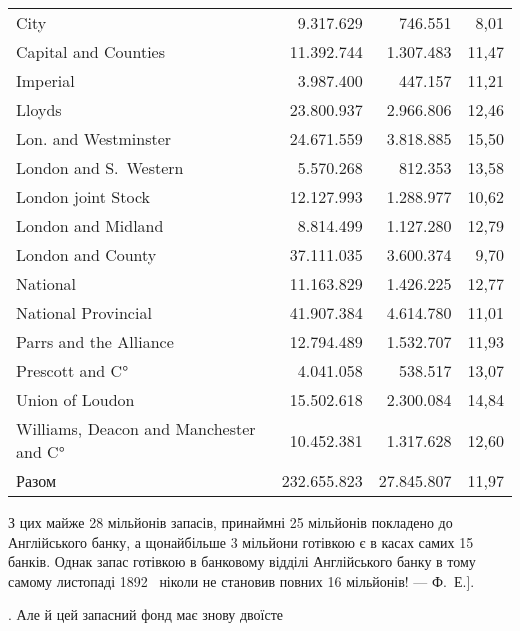 {\begin{tabularx}{\textwidth}{l r r r}
City \dotfill{}                                    & \num{9.317.629}  & \num{746.551}  & 8,01 \\
Capital and Counties \dotfill{}                   & \num{11.392.744} & \num{1.307.483} & 11,47 \\
Imperial \dotfill{}                               & \num{3.987.400}  & \num{447.157}  & 11,21 \\
Lloyds \dotfill{}                                 & \num{23.800.937} & \num{2.966.806} & 12,46 \\
Lon. and Westminster \dotfill{}                   & \num{24.671.559} & \num{3.818.885} & 15,50 \\
London and S.~Western \dotfill{}                  & \num{5.570.268}  & \num{812.353}  & 13,58 \\
London joint Stock \dotfill{}                     & \num{12.127.993} & \num{1.288.977} & 10,62 \\
London and Midland \dotfill{}                     & \num{8.814.499}  & \num{1.127.280} & 12,79 \\
London and County \dotfill{}                      & \num{37.111.035} & \num{3.600.374} & 9,70 \\
National \dotfill{}                               & \num{11.163.829} & \num{1.426.225} & 12,77 \\
National Provincial \dotfill{}                     & \num{41.907.384} & \num{4.614.780} & 11,01 \\
Parrs and the Alliance \dotfill{}                 & \num{12.794.489} & \num{1.532.707} & 11,93 \\
Prescott and C° \dotfill{}                        & \num{4.041.058}  & \num{538.517}  & 13,07 \\
Union of Loudon \dotfill{}                       & \num{15.502.618} & \num{2.300.084} & 14,84 \\
Williams, Deacon and Manchester and C°\dotfill{} & \num{10.452.381} & \num{1.317.628} & 12,60 \\
\cmidrule(lr){1-4}
Разом                                  & \num{232.655.823} & \num{27.845.807} & 11,97

  \end{tabularx}

З цих майже 28 мільйонів запасів, принаймні 25 мільйонів покладено до Англійського банку, а
щонайбільше 3 мільйони готівкою є в касах самих 15 банків. Однак запас готівкою в банковому відділі
Англійського банку в тому самому листопаді 1892~ ніколи не становив повних 16 мільйонів! — Ф.~Е.].

}. Але й цей запасний фонд має знову двоїсте
